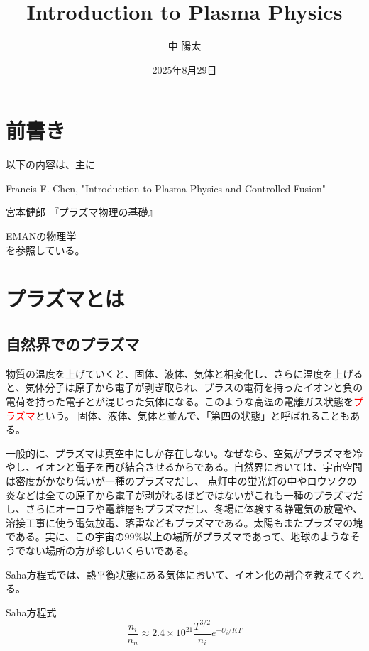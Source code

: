 \documentclass{ltjsarticle}
\title{Introduction to Plasma Physics}
\author{中 陽太}
\date{2025年8月29日}
\numberwithin{equation}{section} %
\begin{document}
\maketitle

\tableofcontents

\section*{前書き}
 以下の内容は、主に

\cite{a} Francis F. Chen, "Introduction to Plasma Physics and Controlled Fusion"\par
\cite{b} 宮本健郎 『プラズマ物理の基礎』\par
\cite{c} EMANの物理学\\
を参照している。





\section{プラズマとは}
\subsection{自然界でのプラズマ}
 物質の温度を上げていくと、固体、液体、気体と相変化し、さらに温度を上げると、気体分子は原子から電子が剥ぎ取られ、プラスの電荷を持ったイオンと負の電荷を持った電子とが混じった気体になる。このような高温の電離ガス状態を\textcolor{red}{プラズマ}という。
固体、液体、気体と並んで、「第四の状態」と呼ばれることもある。

 一般的に、プラズマは真空中にしか存在しない。なぜなら、空気がプラズマを冷やし、イオンと電子を再び結合させるからである。自然界においては、宇宙空間は密度がかなり低いが一種のプラズマだし、
点灯中の蛍光灯の中やロウソクの炎などは全ての原子から電子が剥がれるほどではないがこれも一種のプラズマだし、さらにオーロラや電離層もプラズマだし、冬場に体験する静電気の放電や、溶接工事に使う電気放電、落雷などもプラズマである。太陽もまたプラズマの塊である。実に、この宇宙の99\%以上の場所がプラズマであって、地球のようなそうでない場所の方が珍しいくらいである。

 Saha方程式では、熱平衡状態にある気体において、イオン化の割合を教えてくれる。

\begin{eqbox}{Saha方程式}
\begin{equation}
\frac{n_i}{n_n} \approx 2.4 \times 10^{21} \frac{T^{3/2}}{n_i} e^{-U_i/KT} 
\end{equation}  
\end{eqbox}
\end{document}
